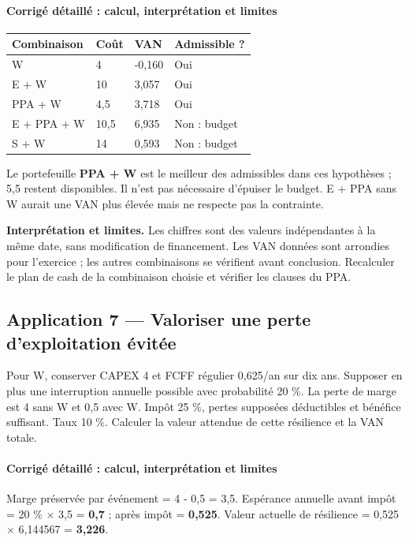 \documentclass[12pt,a4paper]{article}
\begin{document}
\paragraph{Corrigé détaillé : calcul, interprétation et limites}

\Needspace{250pt}
\begin{longtable}{p{3.67cm}p{3.67cm}p{3.67cm}p{3.67cm}}
\toprule
Combinaison & Coût & VAN & Admissible ? \\
\midrule\endhead
W & 4 & -0,160 & Oui \\
E + W & 10 & 3,057 & Oui \\
PPA + W & 4,5 & 3,718 & Oui \\
E + PPA + W & 10,5 & 6,935 & Non : budget \\
S + W & 14 & 0,593 & Non : budget \\
\bottomrule
\end{longtable}
Le portefeuille \textbf{PPA + W} est le meilleur des admissibles dans ces hypothèses ; 5,5 restent disponibles. Il n’est pas nécessaire d’épuiser le budget. E + PPA sans W aurait une VAN plus élevée mais ne respecte pas la contrainte.

\textbf{Interprétation et limites.} Les chiffres sont des valeurs indépendantes à la même date, sans modification de financement. Les VAN données sont arrondies pour l’exercice ; les autres combinaisons se vérifient avant conclusion. Recalculer le plan de cash de la combinaison choisie et vérifier les clauses du PPA.


\subsection*{Application 7 --- Valoriser une perte d’exploitation évitée}
Pour W, conserver CAPEX 4 et FCFF régulier 0,625/an sur dix ans. Supposer en plus une interruption annuelle possible avec probabilité 20 \%. La perte de marge est 4 sans W et 0,5 avec W. Impôt 25 \%, pertes supposées déductibles et bénéfice suffisant. Taux 10 \%. Calculer la valeur attendue de cette résilience et la VAN totale.


\paragraph{Corrigé détaillé : calcul, interprétation et limites}
Marge préservée par événement = 4 - 0,5 = 3,5. Espérance annuelle avant impôt = 20 \% $\times$ 3,5 = \textbf{0,7} ; après impôt = \textbf{0,525}. Valeur actuelle de résilience = 0,525 $\times$ 6,144567 = \textbf{3,226}.
\end{document}
